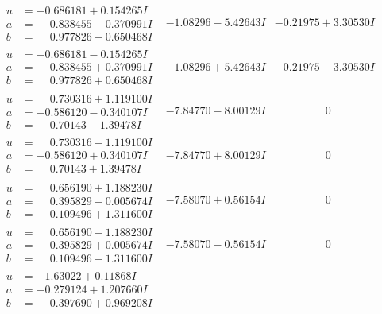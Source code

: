 \documentclass[1p]{elsarticle_modified}
\theoremstyle{definition}
\begin{document}
$$\begin{array}{c|c|c}
\begin{aligned}
u &= -0.686181 + 0.154265 I \\
a &= \phantom{-}0.838455 - 0.370991 I \\
b &= \phantom{-}0.977826 - 0.650468 I\end{aligned}
 & -1.08296 - 5.42643 I & -0.21975 + 3.30530 I \\ \hline\begin{aligned}
u &= -0.686181 - 0.154265 I \\
a &= \phantom{-}0.838455 + 0.370991 I \\
b &= \phantom{-}0.977826 + 0.650468 I\end{aligned}
 & -1.08296 + 5.42643 I & -0.21975 - 3.30530 I \\ \hline\begin{aligned}
u &= \phantom{-}0.730316 + 1.119100 I \\
a &= -0.586120 - 0.340107 I \\
b &= \phantom{-}0.70143 - 1.39478 I\end{aligned}
 & -7.84770 - 8.00129 I & \phantom{-0.000000 } 0 \\ \hline\begin{aligned}
u &= \phantom{-}0.730316 - 1.119100 I \\
a &= -0.586120 + 0.340107 I \\
b &= \phantom{-}0.70143 + 1.39478 I\end{aligned}
 & -7.84770 + 8.00129 I & \phantom{-0.000000 } 0 \\ \hline\begin{aligned}
u &= \phantom{-}0.656190 + 1.188230 I \\
a &= \phantom{-}0.395829 - 0.005674 I \\
b &= \phantom{-}0.109496 + 1.311600 I\end{aligned}
 & -7.58070 + 0.56154 I & \phantom{-0.000000 } 0 \\ \hline\begin{aligned}
u &= \phantom{-}0.656190 - 1.188230 I \\
a &= \phantom{-}0.395829 + 0.005674 I \\
b &= \phantom{-}0.109496 - 1.311600 I\end{aligned}
 & -7.58070 - 0.56154 I & \phantom{-0.000000 } 0 \\ \hline\begin{aligned}
u &= -1.63022 + 0.11868 I \\
a &= -0.279124 + 1.207660 I \\
b &= \phantom{-}0.397690 + 0.969208 I\end{aligned}

\end{array}$$
\end{document}
